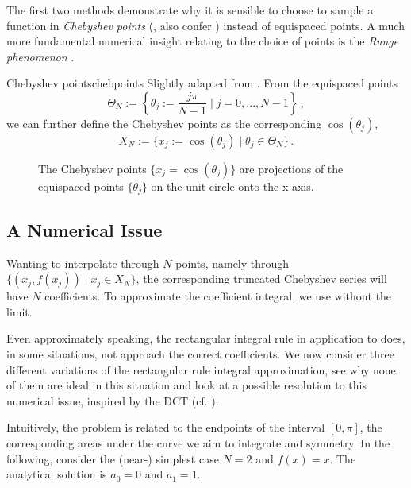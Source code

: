 \documentclass[12pt, a4paper]{article}
\newcommand{\chebyshev}{Chebyshev\xspace}
\begin{document}
  The first two methods demonstrate why it is sensible to choose to sample a function in \textit{\chebyshev points} (, also confer ) instead of equispaced points.
  A much more fundamental numerical insight relating to the choice of points is the \emph{Runge phenomenon} \parencite{runge-phenomenon}.

  \begin{definition}{Chebyshev points}{chebpoints}
    Slightly adapted from \cite{atap}. From the equispaced points
    $$\Theta_N := \left\{\theta_j := \frac{j\pi}{N-1} \;\bigg|\; j = 0, ..., N-1\right\} \,,$$
    we can further define the \chebyshev points as the corresponding $\cos(\theta_j)$,
    $$X_N := \{x_j := \cos(\theta_j) \;|\; \theta_j \in \Theta_N\} \,.$$
  \end{definition}

  \begin{figure}[H]
    \centering
    \caption{The \chebyshev points $\{x_j = \cos(\theta_j)\}$ are projections of the equispaced points $\{\theta_j\}$ on the unit circle onto the x-axis.}
    \label{fig:chebpoints}
  \end{figure}

  \subsection{A Numerical Issue}
  Wanting to interpolate through $N$ points, namely through $\{(x_j, f(x_j)) \;|\; x_j \in X_N\}$, the corresponding truncated \chebyshev series will have $N$ coefficients. To approximate the coefficient integral, we use  without the limit.

  Even approximately speaking, the rectangular integral rule in application to  does, in some situations, not approach the correct coefficients.
  We now consider three different variations of the rectangular rule integral approximation, see why none of them are ideal in this situation and look at a possible resolution to this numerical issue, inspired by the DCT (cf. ).

  Intuitively, the problem is related to the endpoints of the interval $[0, \pi]$, the corresponding areas under the curve we aim to integrate and symmetry.
  In the following, consider the (near-) simplest case $N = 2$ and $f(x) = x$.
  The analytical solution is $a_0 = 0$ and $a_1 = 1$.
\end{document}
